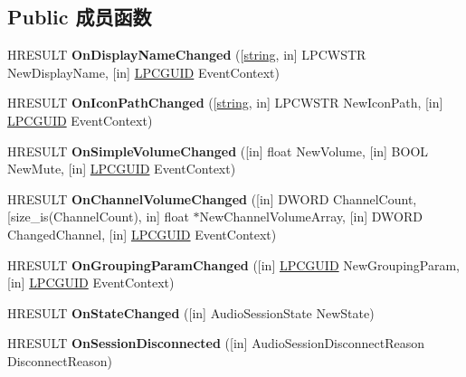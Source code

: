 \subsection*{Public 成员函数}
\begin{DoxyCompactItemize}
\item 
\mbox{\label{interface_i_audio_session_events_a41af269019b4c74364d90a157b25b398}} 
H\+R\+E\+S\+U\+LT {\bfseries On\+Display\+Name\+Changed} (\mbox{[}\hyperlink{structstring}{string}, in\mbox{]} L\+P\+C\+W\+S\+TR New\+Display\+Name, \mbox{[}in\mbox{]} \hyperlink{interface_g_u_i_d}{L\+P\+C\+G\+U\+ID} Event\+Context)
\item 
\mbox{\label{interface_i_audio_session_events_a985e73fa2d4c268e86a05ffe6c98edca}} 
H\+R\+E\+S\+U\+LT {\bfseries On\+Icon\+Path\+Changed} (\mbox{[}\hyperlink{structstring}{string}, in\mbox{]} L\+P\+C\+W\+S\+TR New\+Icon\+Path, \mbox{[}in\mbox{]} \hyperlink{interface_g_u_i_d}{L\+P\+C\+G\+U\+ID} Event\+Context)
\item 
\mbox{\label{interface_i_audio_session_events_ab437040fa9b26cd6245c275bae0eba02}} 
H\+R\+E\+S\+U\+LT {\bfseries On\+Simple\+Volume\+Changed} (\mbox{[}in\mbox{]} float New\+Volume, \mbox{[}in\mbox{]} B\+O\+OL New\+Mute, \mbox{[}in\mbox{]} \hyperlink{interface_g_u_i_d}{L\+P\+C\+G\+U\+ID} Event\+Context)
\item 
\mbox{\label{interface_i_audio_session_events_a652827358b8fbd0f183b23f46353d597}} 
H\+R\+E\+S\+U\+LT {\bfseries On\+Channel\+Volume\+Changed} (\mbox{[}in\mbox{]} D\+W\+O\+RD Channel\+Count, \mbox{[}size\+\_\+is(Channel\+Count), in\mbox{]} float $\ast$New\+Channel\+Volume\+Array, \mbox{[}in\mbox{]} D\+W\+O\+RD Changed\+Channel, \mbox{[}in\mbox{]} \hyperlink{interface_g_u_i_d}{L\+P\+C\+G\+U\+ID} Event\+Context)
\item 
\mbox{\label{interface_i_audio_session_events_a9d0bd035d0af06ff6a78e3c3a2952cbd}} 
H\+R\+E\+S\+U\+LT {\bfseries On\+Grouping\+Param\+Changed} (\mbox{[}in\mbox{]} \hyperlink{interface_g_u_i_d}{L\+P\+C\+G\+U\+ID} New\+Grouping\+Param, \mbox{[}in\mbox{]} \hyperlink{interface_g_u_i_d}{L\+P\+C\+G\+U\+ID} Event\+Context)
\item 
\mbox{\label{interface_i_audio_session_events_a0dcff03b56030df0e281342ef562abde}} 
H\+R\+E\+S\+U\+LT {\bfseries On\+State\+Changed} (\mbox{[}in\mbox{]} Audio\+Session\+State New\+State)
\item 
\mbox{\label{interface_i_audio_session_events_aa1df25e18033d2b7292f9b46d54ed6ab}} 
H\+R\+E\+S\+U\+LT {\bfseries On\+Session\+Disconnected} (\mbox{[}in\mbox{]} Audio\+Session\+Disconnect\+Reason Disconnect\+Reason)
\end{DoxyCompactItemize}
